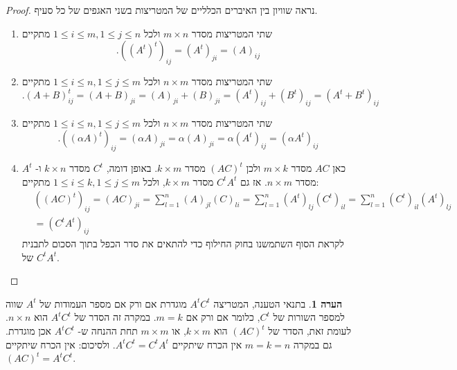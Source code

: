 \documentclass[12pt]{report}
\theoremstyle{plain}
\theoremstyle{definition}
\newtheorem{remark}{הערה}[chapter]
\newcommand{\0}{\mathbf{0}}
\begin{document}
\begin{proof}
נראה שוויון בין האיברים הכלליים של המטריצות בשני האגפים של כל סעיף.
\begin{enumerate}[label=\alph*.]
\item 
שתי המטריצות מסדר
$m\times n$
ולכל 
$1\leq i\leq m, 1\leq j\leq n$
מתקיים
$$
.((A^t)^t)_{ij}=(A^t)_{ji}=(A)_{ij}
$$


\item 
שתי המטריצות מסדר
$n\times m$
ולכל 
$1\leq i\leq n, 1\leq j\leq m$
מתקיים
$$
.(A+B)^t_{ij}=(A+B)_{ji}=(A)_{ji}+(B)_{ji}=(A^t)_{ij}+(B^t)_{ij}=(A^t+B^t)_{ij}
$$


\item
שתי המטריצות מסדר
$n\times m$
ולכל 
$1\leq i\leq n, 1\leq j\leq m$
מתקיים
$$
.((\alpha A)^t)_{ij}=(\alpha A)_{ji}=\alpha (A)_{ji}=\alpha (A^t)_{ij}=(\alpha A^t)_{ij}
$$


\item 
כאן
$AC$
מסדר 
$m\times k$
ולכן
$(AC)^t$
מסדר
$k\times m$.
באופן דומה,
$C^t$
מסדר 
$k\times n$
ו-
$A^t$
מסדר
$n\times m$. 
אז גם
$C^tA^t$
מסדר
$k\times m$,
ולכל
$1\leq i\leq k, 1\leq j\leq m$
מתקיים:
$$
\begin{aligned}
&((AC)^t)_{ij}=(AC)_{ji}=\sum_{l=1}^n (A)_{jl}(C)_{li}=\sum_{l=1}^n (A^t)_{lj}(C^t)_{il}=\sum_{l=1}^n (C^t)_{il}(A^t)_{lj} \\
&=(C^tA^t)_{ij}
\end{aligned}
$$
לקראת הסוף השתמשנו בחוק החילוף כדי להתאים את סדר הכפל בתוך הסכום לתבנית של 
$C^tA^t$.


\end{enumerate}
\end{proof}

\begin{remark}
בתנאי הטענה, המטריצה
$A^tC^t$
מוגדרת אם ורק אם מספר העמודות של
$A^t$
שווה למספר השורות של
$C^t$,
כלומר אם ורק אם 
$m=k$.
במקרה זה הסדר של
$A^tC^t$
הוא
$n\times n$. 
לעומת זאת, הסדר של
$(AC)^t$
הוא
$k\times m$,
או
$m\times m$
תחת ההנחה ש-
$A^tC^t$
אכן מוגדרת. גם במקרה
$m=k=n$
אין הכרח שיתקיים
$A^tC^t=C^tA^t$.
ולסיכום: אין הכרח שיתקיים
$(AC)^t=A^tC^t$.
\end{remark}
\end{document}
